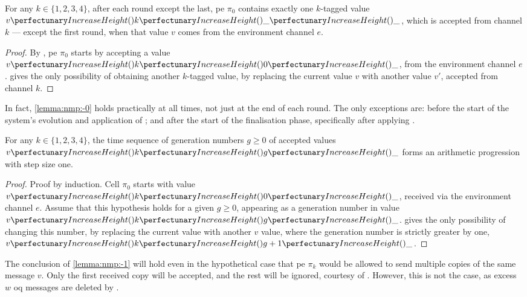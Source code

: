\begin{lemma}\label{lemma:nmp:-0}
    For any $k \in \{ 1, 2, 3, 4 \}$, after each round except the last,
    \gls{pe} $\pi_0$ contains exactly one $k$-tagged value $\cpvv{k}{\cpdiscard}{\cpdiscard}$, 
    which is accepted from channel $k$ 
    --- except the first round, when that value $v$ comes from the environment channel $e$.
\end{lemma}

\begin{proof}
    By , \gls{pe} $\pi_0$ starts by accepting a value $\cpvv{k}{0}{\cpdiscard}$, from the environment channel $e$.
     gives the only possibility of obtaining another $k$-tagged value, by replacing the current value $v$ with another value $v'$, accepted from channel $k$.
\end{proof}

\begin{remark}
    In fact, \cref{lemma:nmp:-0} holds practically at all times, not just at the end of each round.  The only exceptions are: before the start of the system's evolution and application of ; and after the start of the finalisation phase, specifically after applying .
\end{remark}

\begin{lemma}\label{lemma:nmp:-1}
    For any $k \in \{ 1, 2, 3, 4 \}$, the time sequence of generation numbers $g \geq 0$ of accepted values $\cpvv{k}{g}{\cpdiscard}$ forms an arithmetic progression with step size one.
\end{lemma}

\begin{proof}
    Proof by induction. Cell $\pi_0$ starts with value $\cpvv{k}{0}{\cpdiscard}$, received via the environment channel $e$.
    Assume that this hypothesis holds for a given $g \geq 0$, appearing as a generation number in value $\cpvv{k}{g}{\cpdiscard}$.  gives the only possibility of changing this number, by replacing the current value with another $v$ value, where the generation number is strictly greater by one, 
    $\cpvv{k}{g+1}{\cpdiscard}$.
\end{proof}

\begin{remark}\label{remark:nmp:-1}
The conclusion of \cref{lemma:nmp:-1} will hold even in the hypothetical case that \gls{pe} $\pi_k$ would be allowed to send multiple copies of the same message $v$. 
Only the first received copy will be accepted, and the rest will be ignored,
courtesy of . However, this is not the case, as excess \(w\) \gls{oq} messages are deleted by . 
\end{remark}

